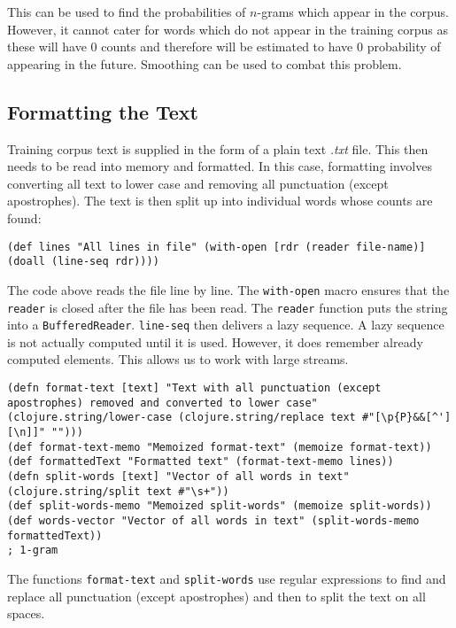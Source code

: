 \noindent This can be used to find the probabilities of $n$-grams which appear in the corpus. However, it cannot cater for words which do not appear in the training corpus as these will have 0 counts and therefore will be estimated to have 0 probability of appearing in the future. Smoothing can be used to combat this problem.

\subsection{Formatting the Text} \label{sec:formattingText}

Training corpus text is supplied in the form of a plain text \textit{.txt} file. This then needs to be read into memory and formatted. In this case, formatting involves converting all text to lower case and removing all punctuation (except apostrophes). The text is then split up into individual words whose counts are found:

\begin{lstlisting}
(def lines "All lines in file" (with-open [rdr (reader file-name)] (doall (line-seq rdr))))
\end{lstlisting}

The code above reads the file line by line. The \lstinline!with-open! macro ensures that the \lstinline!reader! is closed after the file has been read. The \lstinline!reader! function puts the string into a \lstinline!BufferedReader!. \lstinline!line-seq! then delivers a lazy sequence. A lazy sequence is not actually computed until it is used. However, it does remember already computed elements. This allows us to work with large streams.

\begin{lstlisting}
(defn format-text [text] "Text with all punctuation (except apostrophes) removed and converted to lower case" (clojure.string/lower-case (clojure.string/replace text #"[\p{P}&&[^'][\n]]" "")))
(def format-text-memo "Memoized format-text" (memoize format-text))
(def formattedText "Formatted text" (format-text-memo lines))
(defn split-words [text] "Vector of all words in text" (clojure.string/split text #"\s+"))
(def split-words-memo "Memoized split-words" (memoize split-words))
(def words-vector "Vector of all words in text" (split-words-memo formattedText))
; 1-gram
\end{lstlisting}

The functions \lstinline!format-text! and \lstinline!split-words! use regular expressions to find and replace all punctuation (except apostrophes) and then to split the text on all spaces. 

